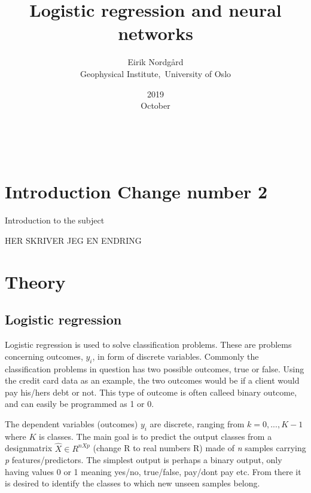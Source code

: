 \documentclass[a4paper,11pt,twocolumn]{article}
\begin{document}
\title{Logistic regression and neural networks}
\date{2019\\ October}
\author{Eirik Nordgård\\ Geophysical Institute,\ University of Oslo}


\

\section{Introduction Change number 2}

Introduction to the subject 

HER SKRIVER JEG EN ENDRING



\section{Theory}


\subsection{Logistic regression}

Logistic regression is used to solve classification problems. These are problems concerning outcomes, $y_i$, in form of discrete variables. Commonly the classification problems in question has two possible outcomes, true or false. Using the credit card data as an example, the two outcomes would be if a client would pay his/hers debt or not. This type of outcome is often calleed binary outcome, and can easily be programmed as 1 or 0.

The dependent variables (outcomes) $y_i$ are discrete, ranging from $k=0,...,K-1$ where $K$ is classes. The main goal is to predict the output classes from a designmatrix $\hat{X} \in R^{nXp}$ (change R to real numbers R) made of \textit{n} samples carrying \textit{p} features/predictors. The simplest output is perhaps a binary output, only having values 0 or 1 meaning yes/no, true/false, pay/dont pay etc. From there it is desired to identify the classes to which new unseen samples belong. 
\end{document}
